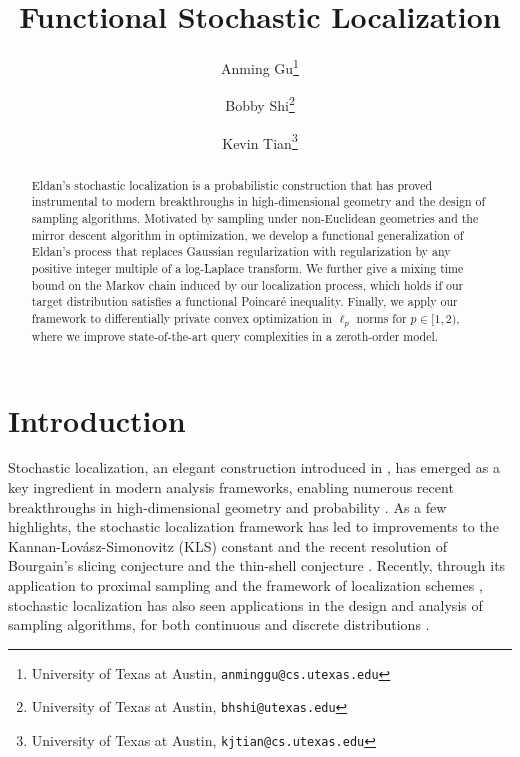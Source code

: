 \documentclass[11pt]{article}
\title{Functional Stochastic Localization}
\date{}
\author{Anming Gu\thanks{University of Texas at Austin, \texttt{anminggu@cs.utexas.edu}}
\and
Bobby Shi\thanks{University of Texas at Austin, \texttt{bhshi@utexas.edu}}
\and 
Kevin Tian\thanks{University of Texas at Austin, \texttt{kjtian@cs.utexas.edu}}}
\newcommand{\0}{\mathbf{0}}
\newcommand{\1}{\mathbf{1}}
\begin{document}
\maketitle

\begin{abstract}
Eldan's stochastic localization is a probabilistic construction that has proved instrumental to modern breakthroughs in high-dimensional geometry and the design of sampling algorithms. Motivated by sampling under non-Euclidean geometries and the mirror descent algorithm in optimization, we develop a functional generalization of Eldan's process that replaces Gaussian regularization with regularization by any positive integer multiple of a log-Laplace transform. We further give a mixing time bound on the Markov chain induced by our localization process, which holds if our target distribution satisfies a functional Poincar\'e inequality. Finally, we apply our framework to differentially private convex optimization in $\ell_p$ norms for $p \in [1, 2)$, where we improve state-of-the-art query complexities in a zeroth-order model.
\end{abstract}



\thispagestyle{empty}
\newpage
\tableofcontents
\thispagestyle{empty}
\newpage

\section{Introduction}\label{sec:introduction}
\setcounter{page}{1}
Stochastic localization, an elegant construction introduced in \cite{Eldan13}, has emerged as a key ingredient in modern analysis frameworks, enabling numerous recent breakthroughs in high-dimensional geometry and probability \cite{LeeV18,Eldan18,Klartag18,Eldan20,EldanMZ20,EldanS22,Guan24}. As a few highlights, the stochastic localization framework has led to improvements to the Kannan-Lov\'asz-Simonovitz (KLS) constant \cite{Eldan13,LeeV24,Chen21,klartagL22,JambulapatiLV22,Klartag23} and the recent resolution of Bourgain's slicing conjecture \cite{KlartagL25a} and the thin-shell conjecture \cite{KlartagL25}.
Recently, through its application to proximal sampling \cite{LeeST21, ChenCSW22} and the framework of localization schemes \cite{ChenE22}, stochastic localization has also seen applications in the design and analysis of sampling algorithms, for both continuous and discrete distributions \cite{EldanKZ22, ElAlaouiMS22, GopLL22, AnariHLVXY23}.
\end{document}
